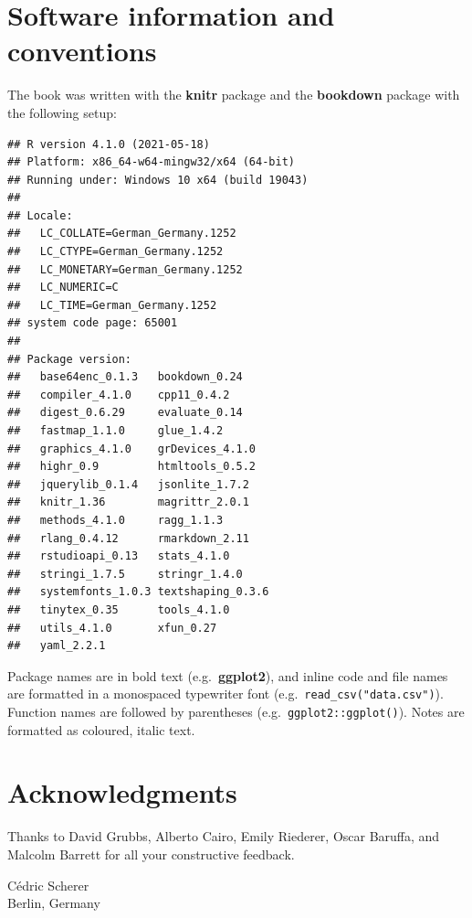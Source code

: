 \documentclass[
]{krantz}
\begin{document}
\hypertarget{software-information-and-conventions}{%
\section*{Software information and conventions}\label{software-information-and-conventions}}


The book was written with the \textbf{knitr} package \citep{xie2015} and the \textbf{bookdown} package \citep{R-bookdown} with the following setup:

\begin{verbatim}
## R version 4.1.0 (2021-05-18)
## Platform: x86_64-w64-mingw32/x64 (64-bit)
## Running under: Windows 10 x64 (build 19043)
## 
## Locale:
##   LC_COLLATE=German_Germany.1252 
##   LC_CTYPE=German_Germany.1252   
##   LC_MONETARY=German_Germany.1252
##   LC_NUMERIC=C                   
##   LC_TIME=German_Germany.1252    
## system code page: 65001
## 
## Package version:
##   base64enc_0.1.3   bookdown_0.24    
##   compiler_4.1.0    cpp11_0.4.2      
##   digest_0.6.29     evaluate_0.14    
##   fastmap_1.1.0     glue_1.4.2       
##   graphics_4.1.0    grDevices_4.1.0  
##   highr_0.9         htmltools_0.5.2  
##   jquerylib_0.1.4   jsonlite_1.7.2   
##   knitr_1.36        magrittr_2.0.1   
##   methods_4.1.0     ragg_1.1.3       
##   rlang_0.4.12      rmarkdown_2.11   
##   rstudioapi_0.13   stats_4.1.0      
##   stringi_1.7.5     stringr_1.4.0    
##   systemfonts_1.0.3 textshaping_0.3.6
##   tinytex_0.35      tools_4.1.0      
##   utils_4.1.0       xfun_0.27        
##   yaml_2.2.1
\end{verbatim}

Package names are in bold text (e.g.~\textbf{ggplot2}), and inline code and file names are formatted in a monospaced typewriter font (e.g.~\texttt{read\_csv("data.csv")}). Function names are followed by parentheses (e.g.~\texttt{ggplot2::ggplot()}). Notes are formatted as {coloured, italic text}.

\hypertarget{acknowledgments}{%
\section*{Acknowledgments}\label{acknowledgments}}


Thanks to David Grubbs, Alberto Cairo, Emily Riederer, Oscar Baruffa, and Malcolm Barrett for all your constructive feedback.

\begin{flushright}
Cédric Scherer\\
Berlin, Germany
\end{flushright}
\end{document}
